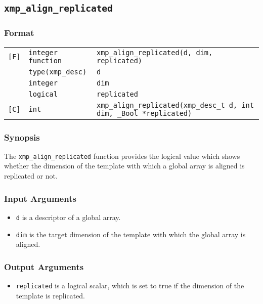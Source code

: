 \subsection{\tt xmp\_align\_replicated}

\subsubsection*{Format}

\begin{tabular}{lll}

\verb![F]!& {\tt integer function}& {\tt xmp\_align\_replicated(d, dim, replicated)}\\
          & {\tt type(xmp\_desc)} & {\tt d}\\
          & {\tt integer} & {\tt dim}\\
          & {\tt logical} & {\tt replicated}\\

\verb![C]!&  {\tt int}& {\tt xmp\_align\_replicated(xmp\_desc\_t d, int dim, \_Bool *replicated)}\\

\end{tabular}

\subsubsection*{Synopsis}

The {\tt xmp\_align\_replicated} function provides the logical value
which shows whether the dimension of the template with which a global
array is aligned is replicated or not. 


\subsubsection*{Input Arguments}
\begin{itemize}
 \item {\tt d} is a descriptor of a global array.
 \item {\tt dim} is the target dimension of the template with which the
       global array is aligned.
\end{itemize}

\subsubsection*{Output Arguments}
\begin{itemize}
 \item {\tt replicated} is a logical scalar, which is set to true if the
       dimension of the template is replicated.

\end{itemize}


